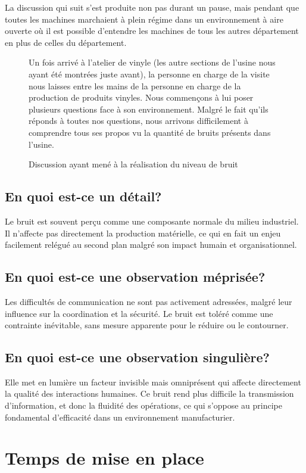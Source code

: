 \documentclass[a11paper]{article}
\newcommand{\boxfig}[3]{%
  \begin{figure}[H]
    \centering
    \begin{tcolorbox}[colback=gray!5!white, colframe=black!50, boxrule=0.5pt,
                      width=0.9\linewidth, arc=3pt, auto outer arc,
                      boxsep=5pt, left=5pt, right=5pt, top=5pt, bottom=5pt]
      #3
    \end{tcolorbox}
    \caption{#1}
    \label{box:#2}
  \end{figure}
}
\begin{document}
La discussion qui suit s'est produite non pas durant un pause, mais pendant que
toutes les machines marchaient à plein régime dans un environnement à aire
ouverte où il est possible d'entendre les machines de tous les autres
département en plus de celles du département.

\boxfig{Discussion ayant mené à la réalisation du niveau de bruit}{noise}{
	Un fois arrivé à l'atelier de vinyle (les autre sections de l'usine nous
	ayant été montrées juste avant), la personne en charge de la visite nous
	laisses entre les mains de la personne en charge de la production de produits
	vinyles. Nous commençons à lui poser plusieurs questions face à son
	environnement. Malgré le fait qu'ils réponds à toutes nos questions, nous
	arrivons difficilement à comprendre tous ses propos vu la quantité de bruits
	présents dans l'usine.
}

\subsection{En quoi est-ce un détail?}

Le bruit est souvent perçu comme une composante normale du milieu industriel.
Il n'affecte pas directement la production matérielle, ce qui en fait un enjeu
facilement relégué au second plan malgré son impact humain et organisationnel.

\subsection{En quoi est-ce une observation méprisée?}

Les difficultés de communication ne sont pas activement adressées, malgré leur
influence sur la coordination et la sécurité. Le bruit est toléré comme une
contrainte inévitable, sans mesure apparente pour le réduire ou le contourner.

\subsection{En quoi est-ce une observation singulière?}

Elle met en lumière un facteur invisible mais omniprésent qui affecte
directement la qualité des interactions humaines. Ce bruit rend plus difficile
la transmission d’information, et donc la fluidité des opérations, ce qui
s’oppose au principe fondamental d’efficacité dans un environnement manufacturier.

\newpage
\section{Temps de mise en place}
\end{document}
